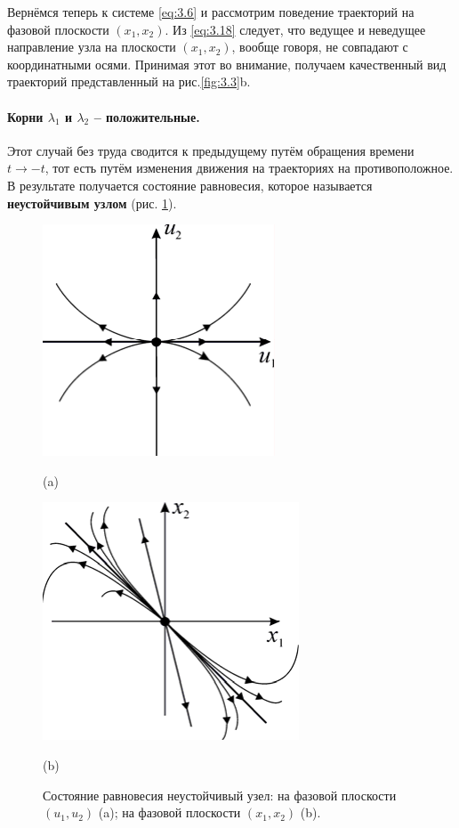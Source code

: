 Вернёмся теперь к системе \eqref{eq:3.6} и рассмотрим поведение траекторий на фазовой плоскости $(x_1,x_2)$. Из \eqref{eq:3.18} следует, что ведущее и неведущее направление узла на плоскости $(x_1,x_2)$, вообще говоря, не совпадают с координатными осями. Принимая этот во внимание, получаем качественный вид траекторий представленный на рис.\ref{fig:3.3}b.

\paragraph{Корни $\lambda_1$ и $\lambda_2$ -- положительные.}%
\label{par:korni_lambda_1_i_lambda_2_polozhitel_nye_}

Этот случай без труда сводится к предыдущему путём обращения времени $t \to - t$, тот есть путём изменения движения на траекториях на противоположное. В результате получается состояние равновесия, которое называется 
\textbf{ неустойчивым узлом} (рис. \ref{fig:3.4}). 
\begin{figure}[h!]
        \centering
        \begin{minipage}{0.45\linewidth}
                \centering  
                \includegraphics[]{fig/lect3/4a}

                (a)
        \end{minipage}
        \begin{minipage}{0.45\linewidth}
                \centering  
                \includegraphics[]{fig/lect3/4b}

                (b)
        \end{minipage}
        \caption{Состояние равновесия неустойчивый узел: на фазовой плоскости $(u_1,u_2)$ (a); на фазовой плоскости $(x_1,x_2)$ (b).}
        \label{fig:3.4}
\end{figure}
